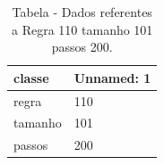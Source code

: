 \begin{table}[H]
\centering
\caption{Tabela - Dados referentes a Regra 110 tamanho 101 passos 200.}
\label{tab:regra_110_tamanho_101_passos_200}
\begin{tabular}{ll}
\toprule
classe & Unnamed: 1 \\
\midrule
regra & 110 \\
tamanho & 101 \\
passos & 200 \\
\bottomrule
\end{tabular}

\end{table}
